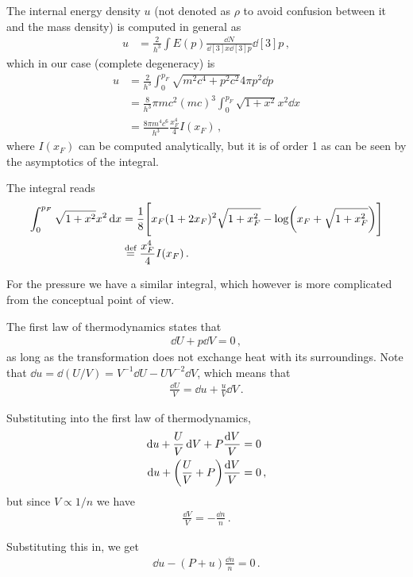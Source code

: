 \documentclass[main.tex]{subfiles}
\begin{document}
The internal energy density \(u\) (not denoted as \(\rho \) to avoid confusion between it and the mass density) is computed in general as 
%
\begin{align}
u &= \frac{2}{h^3}\int E(p) \frac{ \dd{N}}{ \dd[3]{x} \dd[3]{p}} \dd[3]{p} 
\,,
\end{align}
%
which in our case (complete degeneracy) is 
%
\begin{align}
u &= \frac{2}{h^3} \int_{0}^{p_F} \sqrt{m^2c^{4} + p^2c^2} 4 \pi p^2 \dd{p}  \\
&= \frac{8}{h^3} \pi  mc^2 (mc)^3 \int_0^{p_F} \sqrt{1 + x^2} x^2 \dd{x}  \\
&= \frac{8 \pi m^4 c^{6}}{h^3} \frac{x_F^{4}}{4} I(x_F)
\,,
\end{align}
%
where \(I(x_F)\) can be computed analytically, but it is of order 1 as can be seen by the asymptotics of the integral. 

The integral reads 
%
\begin{align}
\int_0^{p_F} \sqrt{1 + x^2} x^2 \dd{x} &= \frac{1}{8} \qty[x_F (1 + 2 x_F)^2 \sqrt{1 + x_F^2} - \log(x_F + \sqrt{1 + x_F^2})]  \\
&\overset{\text{def}}{=} \frac{x_F^{4}}{4} I(x_F)
\,.
\end{align}

For the pressure we have a similar integral, which however is more complicated from the conceptual point of view. 

The first law of thermodynamics states that 
%
\begin{align}
\dd{U} + p \dd{V} = 0
\,,
\end{align}
%
as long as the transformation does not exchange heat with its surroundings. 
Note that \(\dd{u} = \dd{(U/ V)} = V^{-1} \dd{U} - U V^{-2} \dd{V}\), which means that 
%
\begin{align}
\frac{ \dd{U}}{V} = \dd{u} + \frac{u}{V} \dd{V}
\,.
\end{align}

Substituting into the first law of thermodynamics, 
%
\begin{align}
\dd{u} + \frac{U}{V} \dd{V} + P \frac{\dd{V}}{V} &= 0  \\
\dd{u} + \qty( \frac{U}{V} + P) \frac{ \dd{V}}{V} &= 0
\,,
\end{align}
%
but since \(V \propto 1/n\) we have 
%
\begin{align}
\frac{ \dd{V}}{V} = - \frac{ \dd{n}}{n}
\,.
\end{align}

Substituting this in, we get 
%
\begin{align}
\dd{u} - (P+u) \frac{ \dd{n}}{n} = 0 
\,.
\end{align}
\end{document}
